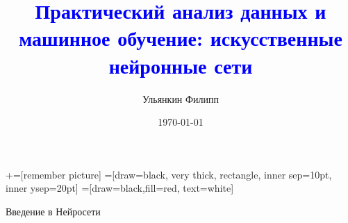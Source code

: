 \documentclass[notes,12pt, aspectratio=169]{beamer}
\title[]{\textcolor{blue}{Практический анализ данных и машинное обучение: искусственные нейронные сети}}
\author{Ульянкин Филипп}
\date{\today}
\begin{document}
\newcommand\marktopleft[1]{%
    \tikz[overlay,remember picture] 
        \node (marker-#1-a) at (-.3em,.3em) {};%
}
\newcommand\markbottomright[2]{%
    \tikz[overlay,remember picture] 
        \node (marker-#1-b) at (0em,0em) {};%
}
+=[remember picture] 
 =[draw=black, very thick, rectangle, inner sep=10pt, inner ysep=20pt]
 =[draw=black,fill=red, text=white]

\begin{frame}
\maketitle
\centering Введение в Нейросети
\end{frame}


{
\begin{frame}
\end{frame}
}
\end{document}
